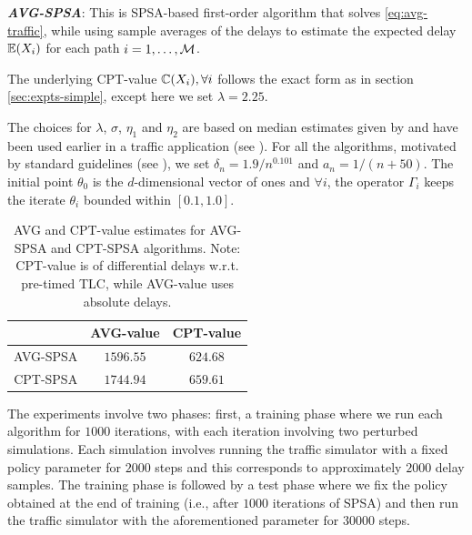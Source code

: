 {\bf\em AVG-SPSA}: This is SPSA-based first-order algorithm that solves \eqref{eq:avg-traffic}, while using sample averages of the delays to estimate the expected delay $\mathbb{E}(X_i)$ for each path $i=1,\ldots,\mathcal{M}$. 

The underlying CPT-value $\mathbb{C}(X_i), \forall i$ follows the exact form as in section \ref{sec:expts-simple}, except here we set $\lambda = 2.25$.

The choices for $\lambda$, $\sigma$, $\eta_1$ and $\eta_2$ are based on median estimates given by \cite{tversky1992advances} and have been used earlier in a traffic application (see \cite{gao2010adaptive}).
For all the algorithms,
 motivated by standard guidelines (see \cite{spall2005introduction}),
 we set $\delta_n = 1.9/n^{0.101}$ and $a_n = 1/(n+50)$. The initial point $\theta_0$ is the $d$-dimensional vector of ones and $\forall i$, the operator $\Gamma_i$ keeps the iterate $\theta_i$ bounded within $[0.1, 1.0]$.

\begin{table}
 \centering
  \caption{AVG and CPT-value estimates for AVG-SPSA and CPT-SPSA algorithms. Note: CPT-value is of differential delays w.r.t. pre-timed TLC, while 
  AVG-value uses absolute delays.}
  \label{tab:cpt-results}
 \begin{tabular}{|c|c|c|}
  \toprule 
   & \textbf{AVG-value}& \textbf{CPT-value }\\\midrule
   AVG-SPSA & $\bm{1596.55}$ & $624.68$ \\\midrule
   CPT-SPSA & $1744.94$ & $\bm{659.61}$\\
   \bottomrule
  \end{tabular}
%   
%   
\end{table}

 
The experiments involve two phases:
first, a training phase where we run each algorithm for $1000$ iterations, with each iteration involving two perturbed simulations. Each simulation involves running the traffic simulator with a fixed policy parameter for $2000$ steps and this corresponds to approximately $2000$ delay samples. The training phase is followed by a test phase where we fix the policy obtained at the end of training (i.e., after $1000$ iterations of SPSA) and then run the traffic simulator with the aforementioned parameter for $30000$ steps. 


